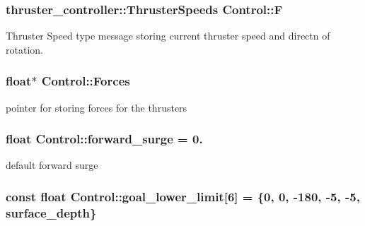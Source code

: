 \subsubsection[{\texorpdfstring{F}{F}}]{\setlength{\rightskip}{0pt plus 5cm}thruster\+\_\+controller\+::\+Thruster\+Speeds Control\+::F\hspace{0.3cm}{\ttfamily [private]}}\hypertarget{classControl_a812e1016b531c2efae35d17b03ec34eb}{}\label{classControl_a812e1016b531c2efae35d17b03ec34eb}


Thruster Speed type message storing current thruster speed and directn of rotation. 

\subsubsection[{\texorpdfstring{Forces}{Forces}}]{\setlength{\rightskip}{0pt plus 5cm}float$\ast$ Control\+::\+Forces\hspace{0.3cm}{\ttfamily [private]}}\hypertarget{classControl_a9d6bd0b67c1a539e3427a6bc87c71939}{}\label{classControl_a9d6bd0b67c1a539e3427a6bc87c71939}


pointer for storing forces for the thrusters 

\subsubsection[{\texorpdfstring{forward\+\_\+surge}{forward_surge}}]{\setlength{\rightskip}{0pt plus 5cm}float Control\+::forward\+\_\+surge = 0.\hspace{0.3cm}{\ttfamily [private]}}\hypertarget{classControl_af4f6b06288fafd78cd2cb384a1a16310}{}\label{classControl_af4f6b06288fafd78cd2cb384a1a16310}


default forward surge 

\subsubsection[{\texorpdfstring{goal\+\_\+lower\+\_\+limit}{goal_lower_limit}}]{\setlength{\rightskip}{0pt plus 5cm}const float Control\+::goal\+\_\+lower\+\_\+limit\mbox{[}6\mbox{]} = \{0, 0, -\/180, -\/5, -\/5, {\bf surface\+\_\+depth}\}\hspace{0.3cm}{\ttfamily [private]}}\hypertarget{classControl_ae28212c8997ed67f06e82356f8a5e67a}{}\label{classControl_ae28212c8997ed67f06e82356f8a5e67a}


